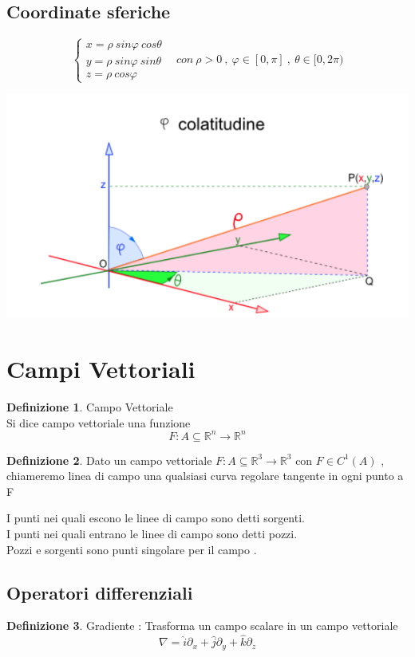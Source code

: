 \documentclass{article}
\theoremstyle{definition}
\newtheorem*{definizione}{Definizione}
\newcommand{\R}{\mathbb{R}}
\newcommand{\Rn}{\R^n}
\begin{document}
	\subsection{Coordinate sferiche}
	$$\begin{cases}
		x=\rho\ sin \varphi \ cos \theta \\
		y=\rho \ sin \varphi\ sin \theta\\
		z=\rho \ cos \varphi 
	\end{cases} \ \ \ \ con \ \rho >0 \ , \ \varphi \in [0,\pi] \ ,\ \theta \in [0,2\pi) $$
	\begin{center}
		\includegraphics[scale=0.40]{immagini/sferiche1.png}
	\end{center}
	\section{Campi Vettoriali}
	\begin{definizione}
		Campo Vettoriale \\
		Si dice campo vettoriale una funzione $$F:A\subseteq \Rn \rightarrow \Rn$$
	\end{definizione}
	\begin{definizione}
		Dato un campo vettoriale $F:A\subseteq \R^3 \rightarrow \R^3$ con $F\in C^1(A)$ , chiameremo linea di campo  una qualsiasi curva regolare tangente in ogni punto a F
	\end{definizione}
	I punti nei quali escono le linee di campo sono detti sorgenti.\\
	I punti nei quali entrano le linee di campo sono detti pozzi.\\
	Pozzi e sorgenti sono punti singolare per il campo .
	\subsection{Operatori differenziali}
	\begin{definizione}
		Gradiente : Trasforma un campo scalare in un campo vettoriale \\
		$$\nabla=\hat{i}\partial_x +\hat{j}\partial_y+\hat{k}\partial_z$$
	\end{definizione} 
\end{document}
